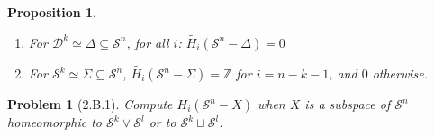 \documentclass[11pt, a4paper, final]{amsart}
\newcommand{\Z}{{\mathbb{Z}}}
\newcommand{\sphere}{\mathcal{S}}
\newcommand{\disk}{\mathcal{D}}
\numberwithin{theorem}{section}
\newtheorem{proposition}[theorem]{Proposition}
\newtheorem{problem}[theorem]{Problem}
\theoremstyle{definition}
\theoremstyle{remark}
\begin{document}
\begin{proposition}\label{proposition: 2B.1, homology of sphere and disc inclusions into sphere}
    \hfill
    \begin{enumerate}
        \item For $\disk^k \simeq \Delta \subseteq \sphere^n$, for all $i$: $\tilde{H_i}(\sphere^n-\Delta) = 0$
        \item For $\sphere^k \simeq \Sigma \subseteq \sphere^n$, $\tilde{H_i}(\sphere^n - \Sigma) = \Z$ for $i = n - k - 1$, and $0$ otherwise. 
    \end{enumerate}
\end{proposition}

\begin{problem}[2.B.1]\label{problem: 2.B.1}
    Compute $H_i(\sphere^n -X)$ when $X$ is a subspace of $\sphere^n$ homeomorphic to $\sphere^k \vee \sphere^l$ or to $\sphere^k \sqcup \sphere^l$.
\end{problem}
\end{document}
